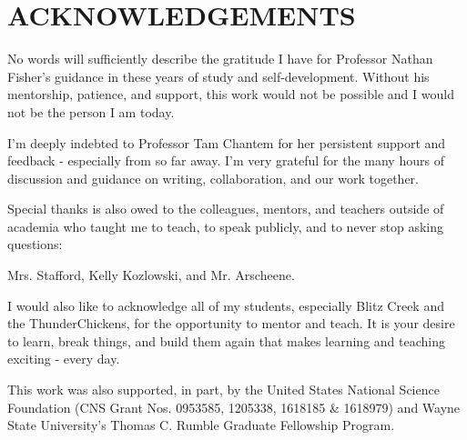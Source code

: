 \section*{ACKNOWLEDGEMENTS}
\begin{center}
No words will sufficiently describe the gratitude I have for Professor Nathan Fisher's guidance in these years of study and self-development.
Without his mentorship, patience, and support, this work would not be possible and I would not be the person I am today.

I'm deeply indebted to Professor Tam Chantem for her persistent support and feedback - especially from so far away.
I'm very grateful for the many hours of discussion and guidance on writing, collaboration, and our work together.

Special thanks is also owed to the colleagues, mentors, and teachers outside of academia who taught me to teach, to speak publicly, and to never stop asking questions:

Mrs. Stafford,
Kelly Kozlowski,
and Mr. Arscheene.

I would also like to acknowledge all of my students, especially Blitz Creek and the ThunderChickens, for the opportunity to mentor and teach.
It is your desire to learn, break things, and build them again that makes learning and teaching exciting - every day.

This work was also supported, in part, by the United States National Science Foundation
(CNS Grant Nos. 0953585, 1205338, 1618185 & 1618979) and Wayne State University's Thomas C. Rumble Graduate Fellowship Program.

\end{center}